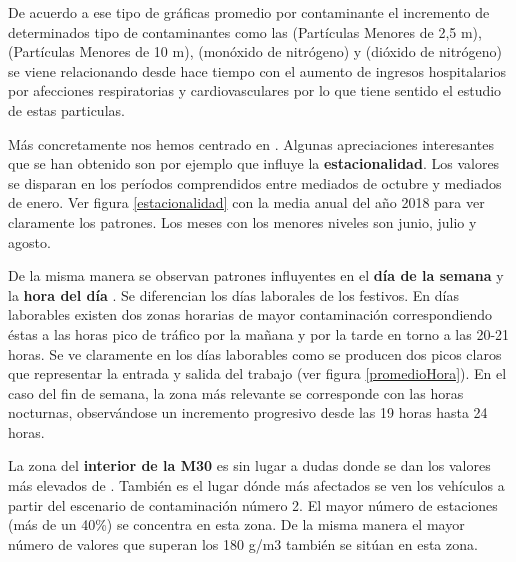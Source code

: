 
	

De acuerdo a ese tipo de gráficas promedio por contaminante el incremento de determinados tipo de contaminantes como las  (Partículas Menores de 2,5 \textmugreek m),  (Partículas Menores de 10 \textmugreek m),  (monóxido de nitrógeno) y  (dióxido de nitrógeno) se viene relacionando desde hace tiempo con el aumento de ingresos hospitalarios por afecciones respiratorias y cardiovasculares por lo que tiene sentido el estudio de estas particulas.

Más concretamente nos hemos centrado en . Algunas apreciaciones interesantes que se han obtenido son por ejemplo que influye la \textbf{estacionalidad}. Los valores se disparan en los períodos comprendidos entre mediados de octubre y mediados de enero. Ver figura \ref{estacionalidad} con la media anual del año 2018 para ver claramente los patrones. Los meses con los menores niveles son junio, julio y agosto. 


De la misma manera se observan patrones influyentes en el \textbf{día de la semana} y la \textbf{hora del día} . Se diferencian los días laborales de los festivos.  En días laborables existen dos zonas horarias de mayor contaminación correspondiendo éstas a las horas pico de tráfico por la mañana y por la tarde en torno a las 20-21 horas.  Se ve claramente en los días laborables como se producen dos picos claros que representar la entrada y salida del trabajo (ver figura \ref{promedioHora}).  En el caso del fin de semana, la zona más relevante se corresponde con las horas nocturnas, observándose un incremento progresivo desde las 19 horas hasta 24 horas. 

	


La zona del \textbf{interior de la M30} es sin lugar a dudas donde se dan los valores más elevados de . También es el lugar dónde más afectados se ven los vehículos a partir del escenario de contaminación número 2. El mayor número de estaciones (más de un 40\%) se concentra en esta zona. De la misma manera el mayor número de valores que superan los 180 \textmugreek g/m3 también se sitúan en esta zona.

